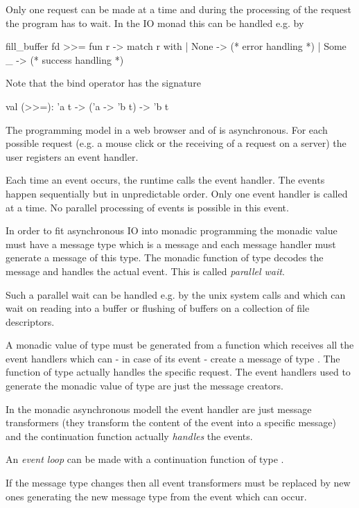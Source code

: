 Only one request can be made at a time and during the processing of the
request the program has to wait. In the IO monad this can be handled e.g. by
%
\begin{ocaml}
  fill_buffer fd >>= fun r ->
  match r with
  | None ->
    (* error handling *)
  | Some _ ->
    (* success handling *)
\end{ocaml}
%
Note that the bind operator has the signature
%
\begin{ocaml}
  val (>>=): 'a t -> ('a -> 'b t) -> 'b t
\end{ocaml}


The programming model in a web browser and of  is
asynchronous. For each possible request (e.g. a mouse click or the receiving
of a request on a server) the user registers an event handler.

Each time an event occurs, the runtime calls the event handler. The events
happen sequentially but in unpredictable order. Only one event handler is
called at a time. No parallel processing of events is possible in this event.

In order to fit asynchronous IO into monadic programming the monadic value
 must have a message type  which is a message and each
message handler must generate a message of this type. The monadic function of
type  decodes the message and handles the actual event. This
is called \emph{parallel wait}.

Such a parallel wait can be handled e.g. by the unix system calls
 and  which can wait on reading into a buffer or
flushing of buffers on a collection of file descriptors.

A monadic value of type  must be generated from a function which
receives all the event handlers which can - in case of its event - create a
message of type . The function of type  actually
handles the specific request. The event handlers used to generate the monadic
value of type   are just the message creators.

In the monadic asynchronous modell the event handler are just message
transformers (they transform the content of the event into a specific message)
and the continuation function actually \emph{handles} the events.

An \emph{event loop} can be made with a continuation function of type .

If the message type changes then all event transformers must be replaced by
new ones generating the new message type from the event which can occur.

